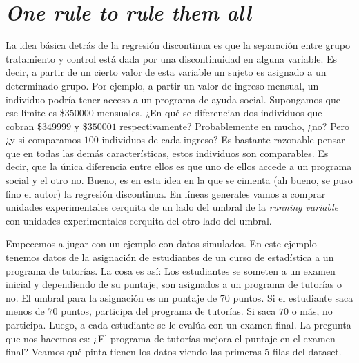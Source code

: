 \documentclass[
  letterpaper,
  DIV=11,
  numbers=noendperiod,
  oneside]{scrreprt}
\begin{document}
\hypertarget{one-rule-to-rule-them-all}{%
\section{\texorpdfstring{\emph{One rule to rule them
all}}{One rule to rule them all}}\label{one-rule-to-rule-them-all}}

La idea básica detrás de la regresión discontinua es que la separación
entre grupo tratamiento y control está dada por una discontinuidad en
alguna variable. Es decir, a partir de un cierto valor de esta variable un
sujeto es asignado a un determinado grupo. Por ejemplo, a partir un
valor de ingreso mensual, un individuo podría tener acceso a un programa
de ayuda social. Supongamos que ese límite es \$\(350000\) mensuales.
¿En qué se diferencian dos individuos que cobran \$\(349999\) y
\$\(350001\) respectivamente? Probablemente en mucho, ¿no? Pero ¿y si
comparamos \(100\) individuos de cada ingreso? Es bastante razonable
pensar que en todas las demás características, estos individuos son
comparables. Es decir, que la única diferencia entre ellos es que uno de
ellos accede a un programa social y el otro no. Bueno, es en esta idea
en la que se cimenta (ah bueno, se puso fino el autor) la regresión
discontinua. En líneas generales vamos a comprar unidades experimentales
cerquita de un lado del umbral de la \emph{running variable} con
unidades experimentales cerquita del otro lado del umbral.

Empecemos a jugar con un ejemplo con datos simulados. En este ejemplo
tenemos datos de la asignación de estudiantes de un curso de estadística
a un programa de tutorías. La cosa es así: Los estudiantes se someten a
un examen inicial y dependiendo de su puntaje, son asignados a un
programa de tutorías o no. El umbral para la asignación es un puntaje de
\(70\) puntos. Si el estudiante saca menos de \(70\) puntos, participa
del programa de tutorías. Si saca \(70\) o más, no participa. Luego, a
cada estudiante se le evalúa con un examen final. La pregunta que nos
hacemos es: ¿El programa de tutorías mejora el puntaje en el examen
final? Veamos qué pinta tienen los datos viendo las primeras 5 filas del
dataset.
\end{document}
